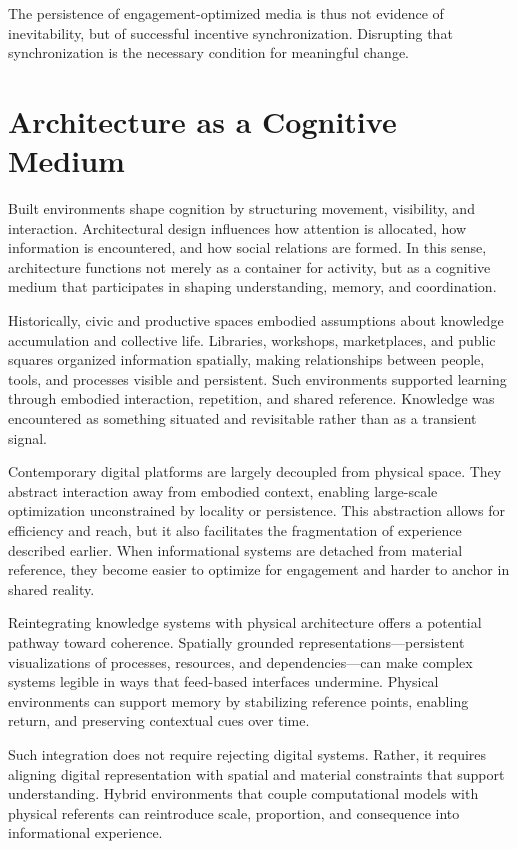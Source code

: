 \documentclass[12pt]{article}
\begin{document}
The persistence of engagement-optimized media is thus not evidence of inevitability, but of successful incentive synchronization. Disrupting that synchronization is the necessary condition for meaningful change.

\section{Architecture as a Cognitive Medium}

Built environments shape cognition by structuring movement, visibility, and interaction. Architectural design influences how attention is allocated, how information is encountered, and how social relations are formed. In this sense, architecture functions not merely as a container for activity, but as a cognitive medium that participates in shaping understanding, memory, and coordination.

Historically, civic and productive spaces embodied assumptions about knowledge accumulation and collective life. Libraries, workshops, marketplaces, and public squares organized information spatially, making relationships between people, tools, and processes visible and persistent. Such environments supported learning through embodied interaction, repetition, and shared reference. Knowledge was encountered as something situated and revisitable rather than as a transient signal.

Contemporary digital platforms are largely decoupled from physical space. They abstract interaction away from embodied context, enabling large-scale optimization unconstrained by locality or persistence. This abstraction allows for efficiency and reach, but it also facilitates the fragmentation of experience described earlier. When informational systems are detached from material reference, they become easier to optimize for engagement and harder to anchor in shared reality.

Reintegrating knowledge systems with physical architecture offers a potential pathway toward coherence. Spatially grounded representations—persistent visualizations of processes, resources, and dependencies—can make complex systems legible in ways that feed-based interfaces undermine. Physical environments can support memory by stabilizing reference points, enabling return, and preserving contextual cues over time.

Such integration does not require rejecting digital systems. Rather, it requires aligning digital representation with spatial and material constraints that support understanding. Hybrid environments that couple computational models with physical referents can reintroduce scale, proportion, and consequence into informational experience.
\end{document}
